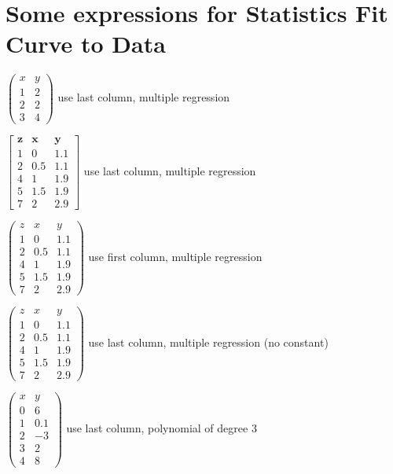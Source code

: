 \documentclass{article}
\begin{document}
\section{Some expressions for Statistics Fit Curve to Data}

$\left( 
\begin{array}{cc}
x & y \\ 
1 & 2 \\ 
2 & 2 \\ 
3 & 4%
\end{array}%
\right) $ use last column, multiple regression

$\left[ 
\begin{array}{ccc}
\mathbf{z} & \mathbf{x} & \mathbf{y} \\ 
1 & 0 & 1.1 \\ 
2 & 0.5 & 1.1 \\ 
4 & 1 & 1.9 \\ 
5 & 1.5 & 1.9 \\ 
7 & 2 & 2.9%
\end{array}%
\right] $ use last column, multiple regression

$\left( 
\begin{array}{ccc}
z & x & y \\ 
1 & 0 & 1.1 \\ 
2 & 0.5 & 1.1 \\ 
4 & 1 & 1.9 \\ 
5 & 1.5 & 1.9 \\ 
7 & 2 & 2.9%
\end{array}%
\right) $ use first column, multiple regression

$\left( 
\begin{array}{ccc}
z & x & y \\ 
1 & 0 & 1.1 \\ 
2 & 0.5 & 1.1 \\ 
4 & 1 & 1.9 \\ 
5 & 1.5 & 1.9 \\ 
7 & 2 & 2.9%
\end{array}%
\right) $ use last column, multiple regression (no constant)

$\left( 
\begin{array}{rr}
x & y \\ 
0 & 6 \\ 
1 & 0.1 \\ 
2 & -3 \\ 
3 & 2 \\ 
4 & 8%
\end{array}%
\right) $ use last column, polynomial of degree $3$
\end{document}
